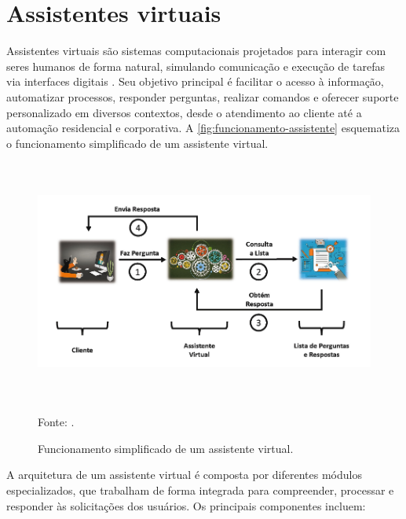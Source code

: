 \section{Assistentes virtuais}

Assistentes virtuais são sistemas computacionais projetados para interagir com seres humanos de forma natural, simulando comunicação e execução de tarefas via interfaces digitais \cite{cruz_assistentes_2018}. Seu objetivo principal é facilitar o acesso à informação, automatizar processos, responder perguntas, realizar comandos e oferecer suporte personalizado em diversos contextos, desde o atendimento ao cliente até a automação residencial e corporativa. A \autoref{fig:funcionamento-assistente} esquematiza o funcionamento simplificado de um assistente virtual.


\begin{figure}[H]
    \caption{Funcionamento simplificado de um assistente virtual.}
    \label{fig:funcionamento-assistente}
    \centering
    \includegraphics[width=\linewidth, height=8cm]{imagens/2-funcionamento-assistente-virtual.png}    
    {\par \raggedright \footnotesize Fonte: \textcite{cruz_assistentes_2018}.\par}
\end{figure}



A arquitetura de um assistente virtual é composta por diferentes módulos especializados, que trabalham de forma integrada para compreender, processar e responder às solicitações dos usuários. Os principais componentes incluem:

